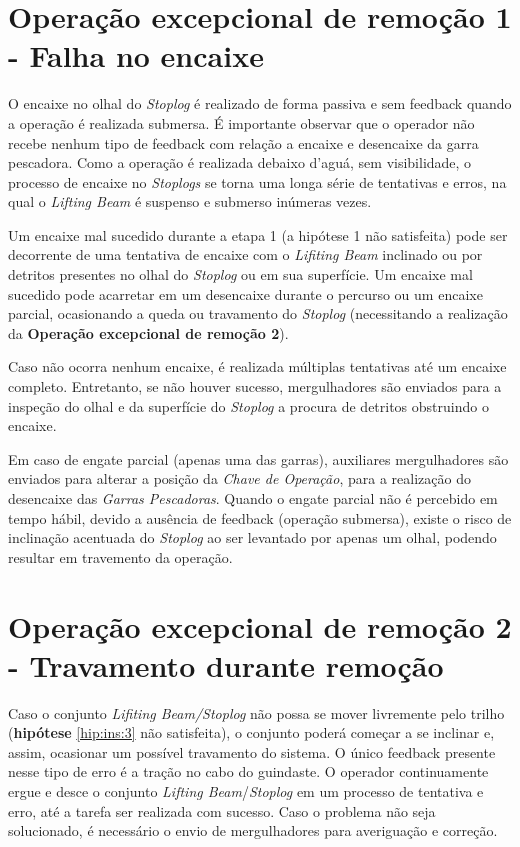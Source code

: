 \section{Operação excepcional de remoção 1 - Falha no encaixe}
\label{op:rem:1}
O encaixe no olhal do \emph{Stoplog} é realizado de forma passiva e sem feedback
quando a operação é realizada submersa. É importante observar que o operador não
recebe nenhum tipo de feedback com relação a encaixe e desencaixe da garra
pescadora. Como a operação é realizada debaixo d'aguá, sem visibilidade, o
processo de encaixe no \emph{Stoplogs} se torna uma longa série de tentativas e
erros, na qual o \emph{Lifting Beam} é suspenso e submerso inúmeras vezes.

Um encaixe mal sucedido durante a etapa 1 (a hipótese 1 não satisfeita) pode ser
decorrente de uma tentativa de encaixe com o \emph{Lifiting Beam} inclinado ou
por detritos presentes no olhal do \emph{Stoplog} ou em sua superfície. Um
encaixe mal sucedido pode acarretar em um desencaixe durante o percurso ou um
encaixe parcial, ocasionando a queda ou travamento do \emph{Stoplog}
(necessitando a realização da \textbf{Operação excepcional de remoção 2}).

Caso não ocorra nenhum encaixe, é realizada múltiplas tentativas até um encaixe
completo. Entretanto, se não houver sucesso, mergulhadores são enviados para a
inspeção do olhal e da superfície do \emph{Stoplog} a procura de detritos
obstruindo o encaixe.

Em caso de engate parcial (apenas uma das garras), auxiliares mergulhadores
são enviados para alterar a posição da \emph{Chave de Operação}, para a
realização do desencaixe das \emph{Garras Pescadoras}. Quando o engate
parcial não é percebido em tempo hábil, devido a ausência de feedback (operação
submersa), existe o risco de inclinação acentuada do \emph{Stoplog} ao ser
levantado por apenas um olhal, podendo resultar em travemento da operação.



\section{Operação excepcional de remoção 2 - Travamento durante remoção}
\label{op:rem:2}

Caso o conjunto \emph{Lifiting Beam/Stoplog} não possa se mover livremente pelo
trilho (\textbf{hipótese} \ref{hip:ins:3} não satisfeita), o conjunto poderá
começar a se inclinar e, assim, ocasionar um possível travamento do sistema. O único feedback
presente nesse tipo de erro é a tração no cabo do guindaste. O operador continuamente ergue e 
desce o conjunto \emph{Lifting Beam}/\emph{Stoplog} em um processo de tentativa e erro, até a tarefa ser realizada com sucesso.
Caso o problema não seja solucionado, é necessário o envio de mergulhadores para averiguação e correção. 

